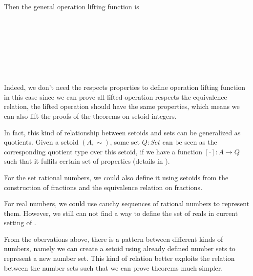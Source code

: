 \documentclass{article}
\begin{document}
Then the general operation lifting function is

\begin{code}\>\<%
\\
%
\\
\> \<[8]%
\>[8]\AgdaSymbol{:} \AgdaSymbol{(} \AgdaSymbol{:}  \AgdaSymbol{)}\<%
\\
\>[2]\<[8]%
\>[8]  \<%
\\
\>    \AgdaSymbol{=} \AgdaFunction{[}        \AgdaFunction{]}\<%
\\
%
\\
\>\<\end{code}

Indeed, we don't need the respects properties to define operation lifting function in this case since we can prove all lifted operation respects the equivalence relation, the lifted operation should have the same properties, which means we can also lift the proofs of the theorems on setoid integers.





In fact, this kind of relationship between setoids and sets can be generalized
as quotients. Given a setoid $(A,\sim)$, some set $ Q : Set $ can be seen as the corresponding quotient type over this setoid, if we have a function $  [ \cdot ] : A → Q $ such that it fulfils certain set of properties (details in \cite{aan}).

For the set rational numbers, we could also define it using setoids from the construction of fractions and the equivalence relation on fractions.

For real numbers, we could use cauchy sequences of rational numbers to represent them. However, we still can not find a way to define the set of reals in current setting of \itt{}.

From the obervations above, there is a pattern between different kinds of numbers, namely we can create a setoid using already defined number sets to represent a new number set. This kind of relation better exploits the relation between the number sets such that we can prove theorems much simpler.
\end{document}
